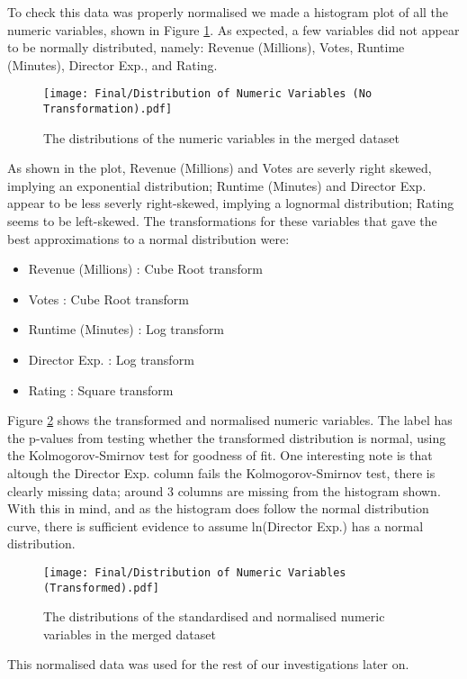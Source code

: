         To check this data was properly normalised we made a histogram plot of all the numeric variables, shown in Figure \ref*{fig-distribution-of-numeric-variable}.
        As expected, a few variables did not appear to be normally distributed, namely: Revenue (Millions), Votes, Runtime (Minutes), 
            Director Exp., and Rating.
        \begin{figure}[H]
            \centering
            \texttt{[image: Final/Distribution of Numeric Variables (No Transformation).pdf]}
            \caption[short]{The distributions of the numeric variables in the merged dataset}\label{fig-distribution-of-numeric-variable}
        \end{figure}
        As shown in the plot, Revenue (Millions) and Votes are severly right skewed, implying an exponential distribution;
        Runtime (Minutes) and Director Exp. appear to be less severly right-skewed, implying a lognormal distribution;
        Rating seems to be left-skewed.
        The transformations for these variables that gave the best approximations to a normal distribution were:
        \begin{multicols}{2}
            \begin{itemize}
                \item Revenue (Millions) : Cube Root transform
                \item Votes              : Cube Root transform
                \item Runtime (Minutes)  : Log transform
                \item Director Exp.      : Log transform
                \item Rating             : Square transform
            \end{itemize}
        \end{multicols}
        Figure \ref*{fig-transformed-distribution-of-numeric-variable} shows the transformed and normalised numeric variables.
        The label has the p-values from testing whether the transformed distribution is normal, using the Kolmogorov-Smirnov
            test\cite*{KStest} for goodness of fit.
        One interesting note is that altough the Director Exp. column fails the Kolmogorov-Smirnov test, there is clearly missing
            data; around 3 columns are missing from the histogram shown.
        With this in mind, and as the histogram does follow the normal distribution curve, there is sufficient evidence to assume
            ln(Director Exp.) has a normal distribution.
        \begin{figure}[H]
            \centering
            \texttt{[image: Final/Distribution of Numeric Variables (Transformed).pdf]}
            \caption[short]{The distributions of the standardised and normalised numeric variables in the merged dataset}\label{fig-transformed-distribution-of-numeric-variable}
        \end{figure}
        This normalised data was used for the rest of our investigations later on.
